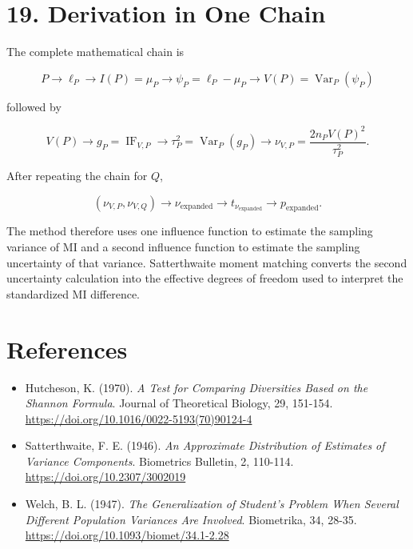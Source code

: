 \documentclass[
  11pt]{article}
\providecommand{\tightlist}{%
  \setlength{\itemsep}{0pt}\setlength{\parskip}{0pt}}
\let\originalsection\section
\renewcommand{\section}{\clearpage\originalsection}
\begin{document}
\section{19. Derivation in One Chain}\label{derivation-in-one-chain}

The complete mathematical chain is

\begin{equation}
P
\longrightarrow
\ell_P
\longrightarrow
I(P)=\mu_P
\longrightarrow
\psi_P=\ell_P-\mu_P
\longrightarrow
V(P)=\operatorname{Var}_P(\psi_P)
\end{equation}

followed by

\begin{equation}
V(P)
\longrightarrow
g_P=\operatorname{IF}_{V,P}
\longrightarrow
\tau_P^2=\operatorname{Var}_P(g_P)
\longrightarrow
\nu_{V,P}=\frac{2n_PV(P)^2}{\tau_P^2}.
\end{equation}

After repeating the chain for \(Q\),

\begin{equation}
(\nu_{V,P},\nu_{V,Q})
\longrightarrow
\nu_{\mathrm{expanded}}
\longrightarrow
t_{\nu_{\mathrm{expanded}}}
\longrightarrow
p_{\mathrm{expanded}}.
\end{equation}

The method therefore uses one influence function to estimate the
sampling variance of MI and a second influence function to estimate the
sampling uncertainty of that variance. Satterthwaite moment matching
converts the second uncertainty calculation into the effective degrees
of freedom used to interpret the standardized MI difference.

\section{References}\label{references}

\begin{itemize}
\tightlist
\item
  Hutcheson, K. (1970). \emph{A Test for Comparing Diversities Based on
  the Shannon Formula}. Journal of Theoretical Biology, 29, 151-154.
  \url{https://doi.org/10.1016/0022-5193(70)90124-4}
\item
  Satterthwaite, F. E. (1946). \emph{An Approximate Distribution of
  Estimates of Variance Components}. Biometrics Bulletin, 2, 110-114.
  \url{https://doi.org/10.2307/3002019}
\item
  Welch, B. L. (1947). \emph{The Generalization of Student's Problem
  When Several Different Population Variances Are Involved}. Biometrika,
  34, 28-35. \url{https://doi.org/10.1093/biomet/34.1-2.28}
\end{itemize}
\end{document}
